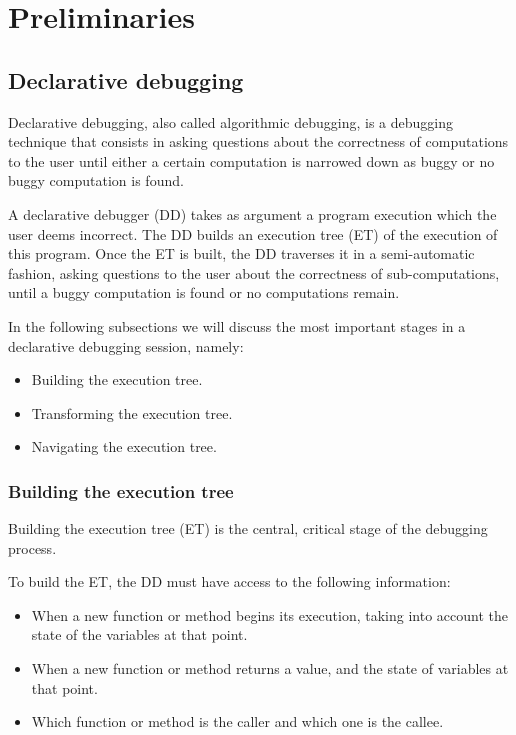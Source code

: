 \chapter{Preliminaries}
\label{cap:preliminares}

\section{Declarative debugging}
Declarative debugging, also called algorithmic debugging, is a debugging technique that consists in asking questions about the correctness of computations to the user until either a certain computation is narrowed down as buggy or no buggy computation is found.

A declarative debugger (DD) takes as argument a program execution which the user deems incorrect.
The DD builds an execution tree (ET) of the execution of this program.
Once the ET is built, the DD traverses it in a semi-automatic fashion, asking questions to the user about the correctness of sub-computations, until a buggy computation is found or no computations remain. 


In the following subsections we will discuss the most important stages in a declarative debugging session, namely:
\begin{itemize}
    \item Building the execution tree.
    \item Transforming the execution tree.
    \item Navigating the execution tree.
\end{itemize}
\subsection{Building the execution tree}

Building the execution tree (ET) is the central, critical stage of the debugging process.

To build the ET, the DD must have access to the following information:
\begin{itemize}
    \item When a new function or method begins its execution, taking into account the state of the variables at that point. 
    \item When a new function or method returns a value, and the state of variables at that point.
    \item Which function or method is the caller and which one is the callee. 
\end{itemize}

